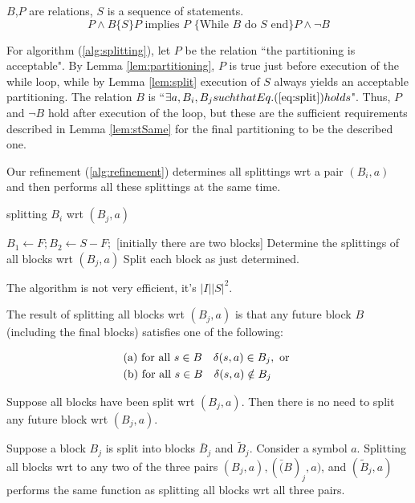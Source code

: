 $B$,$P$ are relations, $S$ is a sequence of statements.
\begin{equation}
	P\land B\{S\}P \text{ implies $P$ \{While $B$ do $S$ end\} } P\land\lnot B
\end{equation}

For algorithm (\ref{alg:splitting}), let $P$ be the relation ``the partitioning is acceptable". By Lemma \ref{lem:partitioning}, $P$ is true just before execution of the while loop, while by Lemma \ref{lem:split} execution of $S$ always yields an acceptable partitioning. The relation $B$ is ``$\exists a,B_i,B_j such that  Eq. (\ref{eq:split}) holds $". Thus, $P$ and $\lnot B$ hold after execution of the loop, but these are the sufficient requirements described in Lemma \ref{lem:stSame} for the final partitioning to be the described one.

Our refinement (\ref{alg:refinement}) determines all splittings wrt a pair $(B_i, a)$ and then performs all these splittings at the same time.
\begin{algorithm}  
	\caption{splitting $B_i$ wrt $(B_j, a)$} 
	\label{alg:refinement} 
	\begin{algorithmic}%
		\State $B_1 \gets F; B_2\gets S-F;$  [initially there are two blocks]  
		\State Determine the splittings of all blocks wrt $(B_j,a)$
		\State Split each block as just determined.
		\EndWhile
	\end{algorithmic}   
\end{algorithm}

The algorithm is not very efficient, it's $|I||S|^2$.

The result of splitting all blocks wrt $(B_j, a)$ is that any future block $B$ (including the final blocks) satisfies one of the following:

\begin{align}
&\text{(a) for all } s\in B\quad \delta(s,a)\in B_j, \text{ or } \label{eq:splitB} \\
&\text{(b) for all } s\in B\quad \delta(s,a)\notin B_j \notag %
\end{align}

\begin{lemma} 
	Suppose all blocks have been split wrt $(B_j, a)$. Then there is no need to split any future block wrt $(B_j, a)$.
\end{lemma}

\begin{lemma} \label{lem:three_pairs}
Suppose a block $B_j$ is split into blocks $\bar{B}_j$ and $\tilde{B}_j$. Consider a symbol $a$. Splitting all blocks wrt to any two of the three pairs $(B_j, a), (\bar(B)_j, a)$, and $(\tilde{B}_j, a)$ performs the same function as splitting all blocks wrt all three pairs.
\end{lemma}

